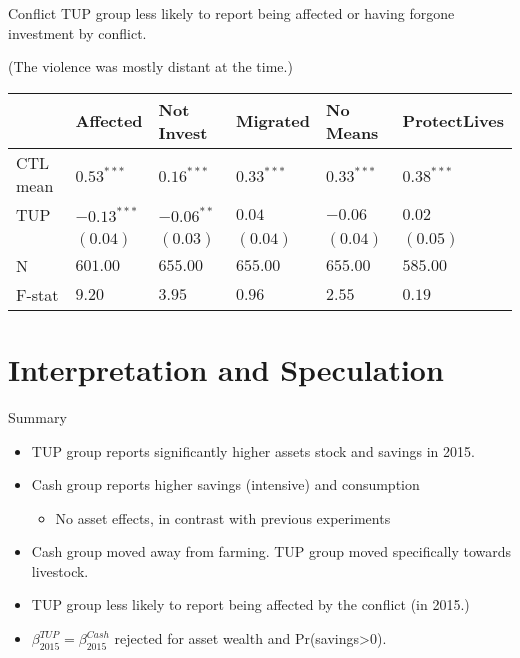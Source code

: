 \documentclass[t,presentation]{beamer}
\begin{document}
\begin{frame}[label={sec:orgheadline21}]{Conflict}
TUP group less likely to report being affected or having forgone investment by conflict.

(The violence was mostly distant at the time.)

\begin{center}
\begin{tabular}{llllll}
\hline
 & Affected & Not Invest & Migrated & No Means & ProtectLives\\
\hline
CTL mean & \(0.53^{***}\) & \(0.16^{***}\) & \(0.33^{***}\) & \(0.33^{***}\) & \(0.38^{***}\)\\
\hline
TUP & \(-0.13^{***}\) & \(-0.06^{**}\) & \(0.04\) & \(-0.06\) & \(0.02\)\\
 & \(( 0.04)\) & \(( 0.03)\) & \(( 0.04)\) & \(( 0.04)\) & \(( 0.05)\)\\
\hline
N & \(601.00\) & \(655.00\) & \(655.00\) & \(655.00\) & \(585.00\)\\
F-stat & \(9.20\) & \(3.95\) & \(0.96\) & \(2.55\) & \(0.19\)\\
\hline
\end{tabular}
\end{center}
\end{frame}

\section*{Interpretation and Speculation}
\label{sec:orgheadline26}

\begin{frame}[label={sec:orgheadline23}]{Summary}
\begin{itemize}
\item TUP group reports significantly higher assets stock and savings in 2015.

\item Cash group reports higher savings (intensive) and consumption 
\begin{itemize}
\item No asset effects, in contrast with previous experiments
\end{itemize}

\item Cash group moved away from farming. TUP group moved specifically towards livestock.

\item TUP group less likely to report being affected by the conflict (in 2015.)

\item \(\beta^{TUP}_{2015}=\beta^{Cash}_{2015}\) rejected for asset wealth and Pr(savings>0).
\end{itemize}
\end{frame}
\end{document}
